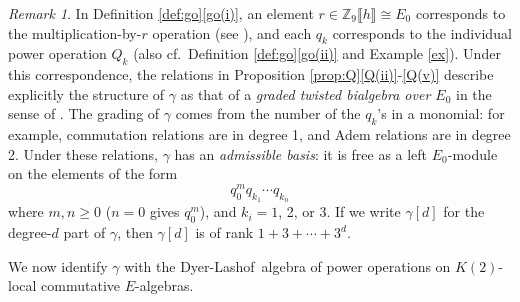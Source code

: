 \documentclass{gtpart}
\theoremstyle{definition}
\theoremstyle{remark}
\newtheorem{rmk}[thm]{Remark}
\newcommand{\mb}[1]{\mathbb{#1}}
\newcommand{\DL}{Dyer-Lashof~}
\newcommand{\BZ}{{\mb Z}}
\newcommand{\g}{\gamma}
\newcommand{\q}[1]{Proposition \ref{prop:Q}\thinspace \eqref{Q(#1)}}
\newcommand{\go}[1]{Definition \ref{def:go}\thinspace \eqref{go(#1)}}
\begin{document}
\begin{rmk}
\label{rmk:rank}
 In \go{i}, an element $r \in \BZ_9 \llbracket h \rrbracket \cong E_0$ 
 corresponds to the multiplication-by-$r$ operation (see 
 \cite[Proposition 6.4]{cong}), and each $q_k$ corresponds to the 
 individual power operation $Q_k$ (also cf.~\go{ii} and Example 
 \ref{ex}).  Under this correspondence, the relations in 
 \q{ii}-\eqref{Q(v)}  describe explicitly the structure of $\g$ as that 
 of a {\em graded twisted bialgebra over $E_0$} in the sense of 
 \cite[Section 5]{cong}.  The grading of $\g$ comes from the number of 
 the $q_k$'s in a monomial: for example, commutation relations are in 
 degree 1, and Adem relations are in degree 2.  Under these relations, 
 $\g$ has an {\em admissible basis}: it is free as a left $E_0$-module 
 on the elements of the form 
 \[
  q_0^m q_{k_1} \cdots q_{k_n} 
 \]
 where $m, n \geq 0$ ($n = 0$ gives $q_0^m$), and $k_i = 1$, 2, or 3.  
 If we write $\g[d]$ for the degree-$d$ part of $\g$, then $\g[d]$ is of 
 rank $1 + 3 + \cdots + 3^d$.  
\end{rmk}

We now identify $\g$ with the \DL algebra of power operations on 
$K(2)$-local commutative $E$-algebras.  
\end{document}

